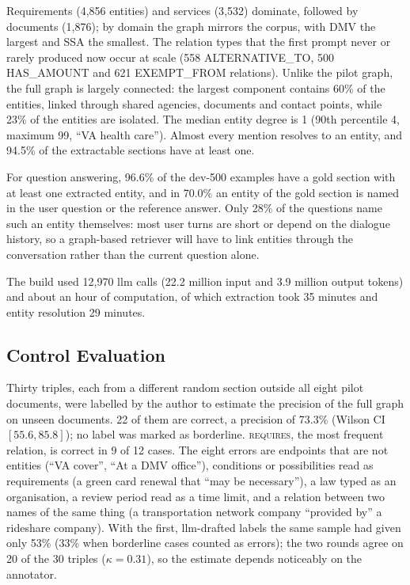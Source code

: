 Requirements (4{,}856 entities) and services (3{,}532) dominate,
followed by documents (1{,}876); by domain the graph mirrors the corpus, with DMV the
largest and SSA the smallest. The relation types that the first prompt never or rarely
produced now occur at scale (558 ALTERNATIVE\_TO, 500 HAS\_AMOUNT and 621 EXEMPT\_FROM
relations). Unlike the pilot graph, the full graph is largely connected: the largest
component contains 60\% of the entities, linked through shared agencies, documents and
contact points, while 23\% of the entities are isolated. The median entity degree is 1
(90th percentile 4, maximum 99, ``VA health care''). Almost every mention resolves to an
entity, and 94.5\% of the extractable sections have at least one.

For question answering, 96.6\% of the dev-500 examples have a gold section with at least
one extracted entity, and in 70.0\% an entity of the gold section is named in the user
question or the reference answer. Only 28\% of the questions name such an entity
themselves: most user turns are short or depend on the dialogue history, so a graph-based
retriever will have to link entities through the conversation rather than the current
question alone.

The build used 12{,}970 \gls{llm} calls (22.2 million input and 3.9 million output
tokens) and about an hour of computation, of which extraction took 35 minutes and entity
resolution 29 minutes.

\subsection{Control Evaluation}

Thirty triples, each from a different random section outside all eight pilot documents,
were labelled by the author to estimate the precision of the full graph on unseen
documents. 22 of them are correct, a precision of 73.3\% (Wilson CI $[55.6, 85.8]$); no
label was marked as borderline. \textsc{requires}, the most frequent relation, is correct
in 9 of 12 cases. The eight errors are endpoints that are not entities (``VA cover'',
``At a DMV office''), conditions or possibilities read as requirements (a green card
renewal that ``may be necessary''), a law typed as an organisation, a review period read
as a time limit, and a relation between two names of the same thing (a
transportation network company ``provided by'' a rideshare company). With the first,
\gls{llm}-drafted labels the same sample had given only 53\% (33\% when borderline cases
counted as errors); the two rounds agree on 20 of the 30 triples ($\kappa = 0.31$), so the
estimate depends noticeably on the annotator.

